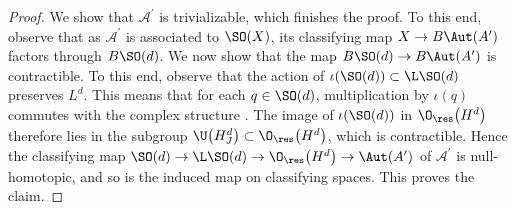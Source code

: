 \begin{proof}
We show that $\mathcal{A}^\prime$ is trivializable, which finishes the proof.
To this end, observe that as $\mathcal{A}^\prime$ is associated to $\SO(X)$, its classifying map $X \to B\Aut(A^\prime)$ factors through $B\SO(d)$.
We now show that the map $B\SO(d) \to B\Aut(A^\prime)$ is contractible.
To this end, observe that the action of $\iota(\SO(d)) \subset \L \SO(d)$ preserves $L^d$.
This means that for each $q \in \SO(d)$, multiplication by $\iota(q)$ commutes with the complex structure .
The image of $\iota(\SO(d))$ in $\O_{\res}\big(H^d\big)$ therefore lies in the subgroup $\U\big(H^d_J\big) \subset \O_{\res}\big(H^d\big)$, which is contractible.
Hence the classifying map $\SO(d) \to \L\SO(d) \to \O_{\res}\big(H^d\big) \to \Aut(A^\prime)$ of $\mathcal{A}^\prime$ is null-homotopic, and so is the induced map on classifying spaces.
This proves the claim.
\end{proof}
